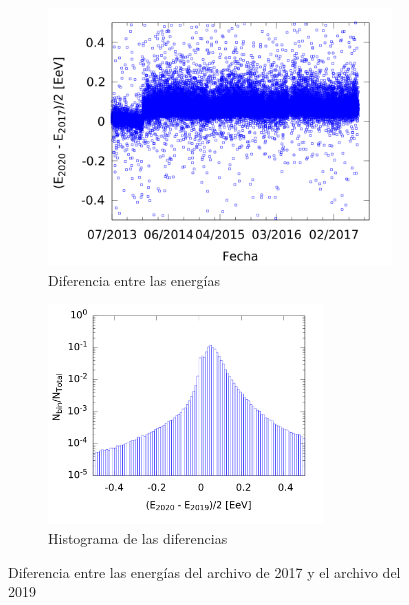          \begin{figure}[H]
            \begin{subfigure}[b]{0.5\textwidth}
              \centering
              \includegraphics[width=\textwidth]{../0_Introduccion/comparacion_deltaE.png}
              \caption{Diferencia entre las energías} \label{fig:deltaE}
            \end{subfigure}%
            \begin{subfigure}[b]{0.5\textwidth}
              \centering
              \includegraphics[width=0.8\textwidth]{../0_Introduccion/histograma_deltaE.png}
              \caption{Histograma de las diferencias}   \label{fig:histograma}
            \end{subfigure}
            \caption{Diferencia entre las energías del archivo de 2017 y el archivo del 2019}
          \end{figure}

